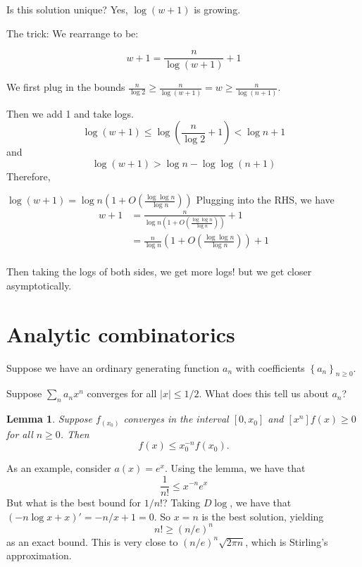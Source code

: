 \documentclass[]{article}
\newtheorem{lemma}[theorem]{Lemma}
\theoremstyle{definition}
\numberwithin{theorem}{section}
\numberwithin{equation}{section}
\begin{document}
Is this solution unique? Yes, $\log(w + 1)$ is growing. 

The trick: We rearrange to be:

\begin{equation}
	w + 1 = \frac{n}{\log( w + 1 )} + 1
\end{equation}

We first plug in the bounds $\frac{n}{\log 2} \geq \frac{n}{\log(w + 1)} = w \geq \frac{n}{\log(n + 1)}$. 

Then we add 1 and take logs.
\begin{equation}
	\log(w + 1) \leq \log(\frac{n}{\log 2} + 1) < \log n + 1
\end{equation}
and
\begin{equation}
	\log(w + 1) > \log n - \log \log (n + 1)
\end{equation}
Therefore, 

$\log(w + 1) = \log n (1 + O(\frac{\log \log n}{\log n}))$
Plugging into the RHS, we have
\begin{align*}
	w + 1 &= \frac{n}{\log n(1 + O(\frac{\log \log n}{\log n}))} + 1\\
	&= \frac{n}{\log n}\left(1 + O(\frac{\log \log n}{\log n})\right) + 1\\
\end{align*}

Then taking the logs of both sides, we get more logs! but we get closer asymptotically.

\section{Analytic combinatorics}

Suppose we have an ordinary generating function $a_n$ with coefficients $\left\{a_n\right\}_{n \geq 0}$. 

Suppose $\sum_n a_n x^n$ converges for all $|x| \leq 1/2$. What does this tell us about $a_n$?
\begin{lemma}
	Suppose $f_(x_0)$ converges in the interval $[0, x_0]$ and $[x^n] f(x) \geq 0$ for all $n \geq 0$. Then 
	\begin{equation}
		[x^n] f(x) \leq x_0^{-n} f(x_0).
	\end{equation}
\end{lemma}
As an example, consider $a(x) = e^x$. Using the lemma, we have that 
\begin{equation}
	\frac{1}{n!} \leq x^{-n} e^x
\end{equation}
But what is the best bound for $1/n!$? Taking $D \log$, we have that $(- n \log x + x)' = - n/x + 1 = 0$. So $x = n$ is the best solution, yielding
\begin{equation}
	n! \geq \left(n/e\right)^n
\end{equation}
as an exact bound. This is very close to $\left(n/e\right)^n \sqrt{2 \pi n}$, which is Stirling's approximation. 
\end{document}
